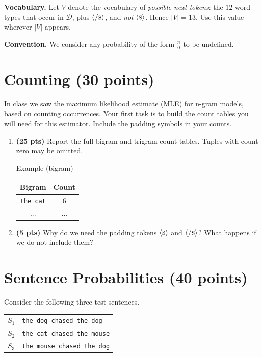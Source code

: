 \documentclass[11pt]{article}
\newcommand{\bs}{\ensuremath{\langle \textsc{s} \rangle}}
\newcommand{\es}{\ensuremath{\langle \textsc{/s} \rangle}}
\newcommand{\wrd}[1]{\texttt{#1}}
\begin{document}
\medskip\noindent
\textbf{Vocabulary.} Let $V$ denote the vocabulary of \emph{possible next tokens}: the $12$ word types that occur in
$\mathcal{D}$, plus \es{}, and \emph{not} \bs{}. Hence $|V| = 13$. Use this value wherever $|V|$ appears.



\medskip\noindent
\textbf{Convention.} We consider any probability of the form $\frac{n}{0}$ to be undefined.


\section{Counting (30 points)}
In class we saw the maximum likelihood estimate (MLE) for n-gram models, based on counting occurrences. 
Your first task is to build the count tables you will need for this estimator. Include the padding symbols in your counts.

\begin{enumerate}[label=(\alph*)]

  \item \textbf{(25 pts)} Report the full bigram and trigram count tables. Tuples with count zero may be omitted.
  
 Example (bigram)

 \begin{table}[H]
     \centering
     \begin{tabular}{c|c}
     \toprule
     Bigram & Count \\
     \midrule
     \wrd{the}\, \wrd{cat} & 6\\
      ... & ... \\
      \bottomrule
     \end{tabular}
 \end{table}

  \item \textbf{(5 pts)} Why do we need the padding tokens \bs{} and \es{}? What happens if we do not
  include them?

\end{enumerate}

\section{Sentence Probabilities (40 points)}

Consider the following three test sentences.

\begin{center}
\begin{tabular}{ll}
\toprule
$S_1$ & \wrd{the dog chased the dog}\\
$S_2$ & \wrd{the cat chased the mouse}\\
$S_3$ & \wrd{the mouse chased the dog}\\
\bottomrule
\end{tabular}
\end{center}
\end{document}
